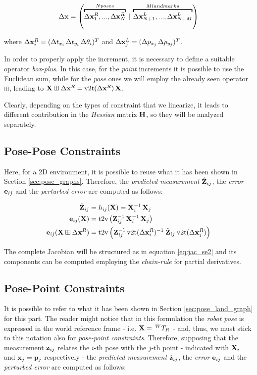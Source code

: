 \begin{equation}
    \dx = \left(\overbracket{\dx^R_1, ..., \dx^R_N}^{N poses}\: |\: \overbracket{\dx^L_{N+1}, ..., \dx^L_{N+M}}^{M landmarks}\right)
    \label{eq:increments_ba_2d}
\end{equation}

\noindent where $\Delta \mathbf{x}^R_i = (\Delta t_{x_i}\, \Delta t_{y_i}\, \Delta \theta_i)^T$ and $\Delta \mathbf{x}^L_j = (\Delta p_{x_j}\, \Delta p_{y_j})^T$.

In order to properly apply the increment, it is necessary to define a suitable operator \textit{box-plus}. In this case, for the \textit{point} increments it is possible to use the Euclidean sum, while for the \textit{pose} ones we will employ the already seen operator $\boxplus$, leading to $\SState \boxplus \dx^R = \v2t(\dx^R)\, \SState$.

Clearly, depending on the types of constraint that we linearize, it leads to different contribution in the \textit{Hessian} matrix $\mathbf{H}$, so they will be analyzed separately.

\subsection{Pose-Pose Constraints}\label{subsec:pose_pose_constraints_2d}
Here, for a 2D environment, it is possible to reuse what it has been shown in Section \ref{sec:pose_graphs}. Therefore, the \textit{predicted measurement} $\hat{\mathbf{Z}}_{ij}$, the \textit{error} $\mathbf{e}_{ij}$ and the \textit{perturbed error} are computed as follows:

\begin{align*}
    \Pred_{ij} &= h_{ij}(\SState) = \SState_i^{-1}\, \SState_j \\
    \error_{ij}(\SState) &= \text{t2v}\left(\Meas_{ij}^{-1}\,\SState_i^{-1}\, \SState_j\right) \\
    \error_{ij}(\SState \boxplus \dx^R) &= \text{t2v}\left(\Meas_{ij}^{-1} \, \v2t(\dx^R_i)^{-1}\: \Pred_{ij} \:\v2t(\dx^R_j) \right)
\end{align*}

\noindent The complete Jacobian will be structured as in equation \ref{eq:jac_se2} and its components can be computed employing the \textit{chain-rule} for partial derivatives.

\subsection{Pose-Point Constraints}\label{subsec:pose_point_constraints_2d}
It is possible to refer to what it has been shown in Section \ref{sec:pose_land_graph} for this part. The reader might notice that in this formulation the \textit{robot pose} is expressed in the world reference frame - i.e. $\mathbf{X} =\, ^{W}T_{R}$ - and, thus, we must stick to this notation also for \textit{pose-point constraints}. Therefore, supposing that the measurement $\mathbf{z}_{ij}$ relates the $i$-th pose with the $j$-th point - indicated with $\mathbf{X}_i$ and $\mathbf{x}_j = \mathbf{p}_j$ respectively - the \textit{predicted measurement} $\hat{\mathbf{z}}_{ij}$, the \textit{error} $\mathbf{e}_{ij}$ and the \textit{perturbed error} are computed as follows:

